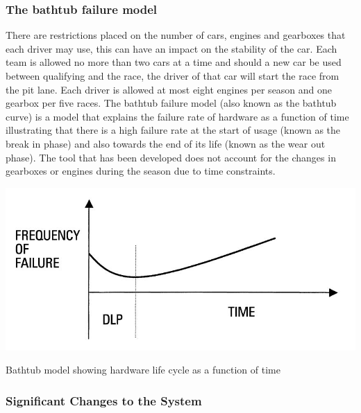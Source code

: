\documentclass[12pt]{article} %
\begin{document}
\subsubsection{The bathtub failure model}
There are restrictions placed on the number of cars, engines and gearboxes that each driver may use, this can have an impact on the stability of the car. Each team is allowed no more than two cars at a time and should a new car be used between qualifying and the race, the driver of that car will start the race from the pit lane. Each driver is allowed at most eight engines per season and one gearbox per five races. The bathtub failure model (also known as the bathtub curve) is a model that explains the failure rate of hardware as a function of time illustrating that there is a high failure rate at the start of usage (known as the break in phase) and also towards the end of its life (known as the wear out phase). The tool that has been developed does not account for the changes in gearboxes or engines during the season due to time constraints.

\begin{center}
\includegraphics[width=0.7\linewidth]{bathtub}
\parbox{10cm}{\caption{Bathtub model showing hardware life cycle as a function of time}}
\end{center}

\subsubsection{Significant Changes to the System}
\end{document}
